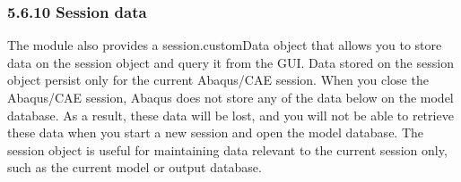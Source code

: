 \documentclass[letterpaper,10pt,english]{sphinxmanual}
\begin{document}
\begin{sphinxVerbatim}[commandchars=\\\{\},numbers=left,firstnumber=1,stepnumber=1]
   
    
 
    

 
  
  
   
  
\end{sphinxVerbatim}


\subsubsection{5.6.10 Session data}
\label{\detokenize{abq_script_guide:session-data}}
The  module also provides a session.customData object that allows you to store data on the session object and query it from the GUI. Data stored on the session object persist only for the current Abaqus/CAE session. When you close the Abaqus/CAE session, Abaqus does not store any of the data below  on the model database. As a result, these data will be lost, and you will not be able to retrieve these data when you start a new session and open the model database. The session object is useful for maintaining data relevant to the current session only, such as the current model or output database.
\end{document}
